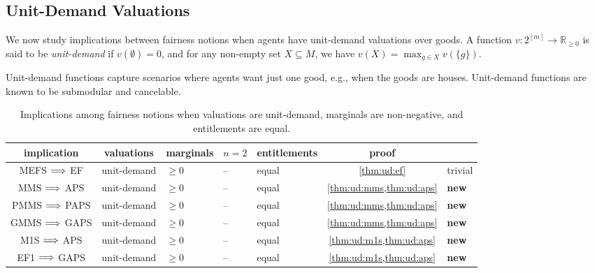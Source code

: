 \subsection{Unit-Demand Valuations}
\label{sec:impls-extra:unit-demand}

We now study implications between fairness notions when agents have unit-demand valuations over goods.
A function $v: 2^{[m]} \to \mathbb{R}_{\ge 0}$ is said to be \emph{unit-demand} if $v(\emptyset) = 0$,
and for any non-empty set $X \subseteq M$, we have $v(X) = \max_{g \in X} v(\{g\})$.

Unit-demand functions capture scenarios where agents want just one good, e.g., when the goods are houses.
Unit-demand functions are known to be submodular and cancelable.

\begin{table}[htb]
\centering
\caption[Unit-demand implications]{Implications among fairness notions when
valuations are unit-demand, marginals are non-negative, and entitlements are equal.}
\label{table:impls-unit-demand}
\small
\begin{tabular}{ccHHHcH}
\toprule implication & \footnotesize valuations & \footnotesize marginals & \footnotesize $n=2$ & \footnotesize entitlements & proof &
\\\midrule MEFS $\Longrightarrow$ EF
    & unit-demand & $\ge 0$ & -- & equal
    & \cref{thm:ud:ef} & trivial
\\[\defaultaddspace] MMS $\Longrightarrow$ APS
    & unit-demand & $\ge 0$ & -- & equal
    & \cref{thm:ud:mms,thm:ud:aps} & \textbf{new}
\\[\defaultaddspace] PMMS $\Longrightarrow$ PAPS
    & unit-demand & $\ge 0$ & -- & equal
    & \cref{thm:ud:mms,thm:ud:aps} & \textbf{new}
\\[\defaultaddspace] GMMS $\Longrightarrow$ GAPS
    & unit-demand & $\ge 0$ & -- & equal
    & \cref{thm:ud:mms,thm:ud:aps} & \textbf{new}
\\[\defaultaddspace] M1S $\Longrightarrow$ APS
    & unit-demand & $\ge 0$ & -- & equal
    & \cref{thm:ud:m1s,thm:ud:aps} & \textbf{new}
\\[\defaultaddspace] EF1 $\Longrightarrow$ GAPS
    & unit-demand & $\ge 0$ & -- & equal
    & \cref{thm:ud:m1s,thm:ud:aps} & \textbf{new}
\\ \bottomrule
\end{tabular}
\end{table}


